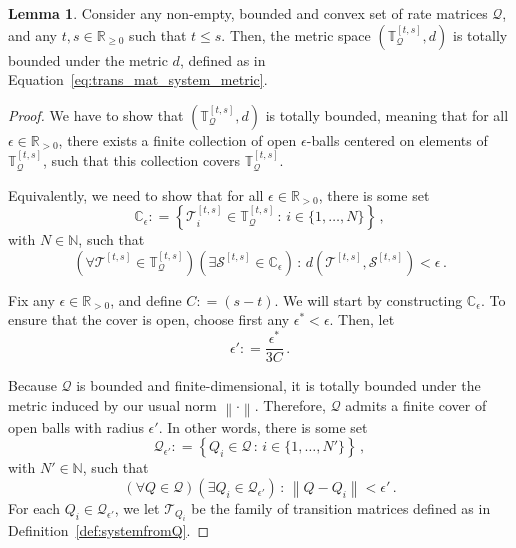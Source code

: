 \documentclass[10pt]{paper}
\theoremstyle{definition}
\newtheorem{lemma}[theorem]{Lemma}
\newcommand{\nats}{\mathbb{N}}
\newcommand{\reals}{\mathbb{R}}
\newcommand{\realspos}{\reals_{>0}}
\newcommand{\realsnonneg}{\reals_{\geq 0}}
\newcommand{\rateset}{\mathcal{Q}}
\newcommand{\norm}[1]{\left\lVert #1 \right\rVert}
\newcommand{\coloneqq}{:\!=}
\begin{document}
\begin{lemma}\label{lemma:restricted_trans_mat_system_totally_bounded_if_Q_bounded_convex}
Consider any non-empty, bounded and convex set of rate matrices $\rateset$, and any $t,s\in\realsnonneg$ such that $t\leq s$. Then, the metric space $(\mathbb{T}_\rateset^{[t,s]},d)$ is totally bounded under the metric $d$, defined as in Equation~\eqref{eq:trans_mat_system_metric}.
\end{lemma}
\begin{proof}
We have to show that $(\mathbb{T}_\rateset^{[t,s]},d)$ is totally bounded, meaning that for all $\epsilon\in\realspos$, there exists a finite collection of open $\epsilon$-balls centered on elements of $\mathbb{T}_\rateset^{[t,s]}$, such that this collection covers $\mathbb{T}_\rateset^{[t,s]}$. 

Equivalently, we need to show that for all $\epsilon\in\realspos$, there is some set
\begin{equation*}
\mathbb{C}_\epsilon\coloneqq \left\{\mathcal{T}_i^{[t,s]}\in\mathbb{T}_\rateset^{[t,s]}\,:\,i\in\{1,\ldots,N\}\right\}\,,
\end{equation*}
with $N\in\nats$, such that
\begin{equation*}
(\forall \mathcal{T}^{[t,s]}\in\mathbb{T}_\rateset^{[t,s]})(\exists \mathcal{S}^{[t,s]}\in \mathbb{C}_\epsilon)\,:\,d(\mathcal{T}^{[t,s]},\mathcal{S}^{[t,s]}) < \epsilon\,.
\end{equation*}

Fix any $\epsilon\in\realspos$, and define $C\coloneqq (s-t)$. We will start by constructing $\mathbb{C}_\epsilon$. To ensure that the cover is open, choose first any $\epsilon^*<\epsilon$. Then, let
\begin{equation*}
\epsilon' \coloneqq \frac{\epsilon^*}{3C}\,.
\end{equation*}

Because $\rateset$ is bounded and finite-dimensional, it is totally bounded under the metric induced by our usual norm $\norm{\cdot}$. Therefore, $\rateset$ admits a finite cover of open balls with radius $\epsilon'$. In other words, there is some set
\begin{equation*}
\rateset_{\epsilon'}\coloneqq \left\{Q_i\in\rateset\,:\,i\in\{1,\ldots,N'\}\right\}\,,
\end{equation*}
with $N'\in\nats$, such that
\begin{equation*}
(\forall Q\in\rateset)(\exists Q_i\in\rateset_{\epsilon'})\,:\,\norm{Q - Q_i} < \epsilon'\,.
\end{equation*}
For each $Q_i\in\rateset_{\epsilon'}$, we let $\mathcal{T}_{Q_i}$ be the family of transition matrices defined as in Definition~\ref{def:systemfromQ}.


\end{proof}
\end{document}
